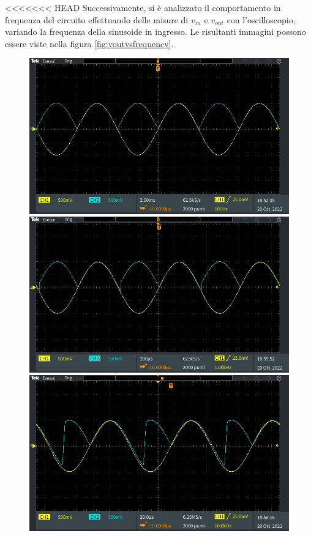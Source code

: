 \noindent
<<<<<<< HEAD
Successivamente, si è analizzato il comportamento in frequenza del circuito effettuando delle misure di $v_{in}$ e $v_{out}$ con l'oscilloscopio, variando la frequenza della sinusoide in ingresso. Le risultanti immagini possono essere viste nella figura \ref{fig:voutvsfrequency}.
\begin{figure}[h]
	\centering
	\begin{minipage}{.496\textwidth}
		\includegraphics[width=\linewidth]{./ImageFiles/Laboratorio 3/TEK00001.PNG}
	\end{minipage}
	\begin{minipage}{.496\textwidth}
		\includegraphics[width=\linewidth]{./ImageFiles/Laboratorio 3/TEK00003.PNG}
	\end{minipage}
	\begin{minipage}{.496\textwidth}
		\includegraphics[width=\linewidth]{./ImageFiles/Laboratorio 3/TEK00004.PNG}

\end{minipage}
\end{figure}
